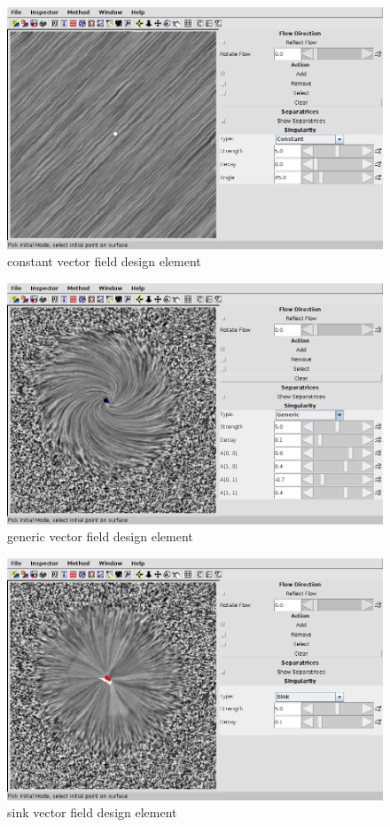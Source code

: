 \documentclass[a4paper,10pt,notitlepage]{scrreprt}
\begin{document}
\begin{figure}
  \centering
  \includegraphics[scale=0.5]{img-3-2/constant.png}
  \caption{constant vector field design element}
  \label{fig:constant}
\end{figure}

\begin{figure}
  \centering
  \includegraphics[scale=0.5]{img-3-2/generic.png}
  \caption{generic vector field design element}
  \label{fig:generic}
\end{figure}

\begin{figure}
  \centering
  \includegraphics[scale=0.5]{img-3-2/sink.png}
  \caption{sink vector field design element}
  \label{fig:sink}
\end{figure}
\end{document}
